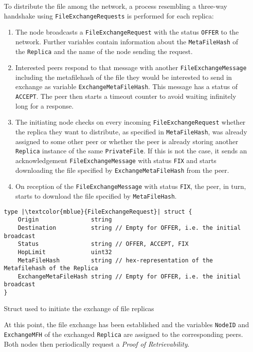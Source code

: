\documentclass{article}
\begin{document}
To distribute the file among the network, a process resembling a three-way handshake using \texttt{FileExchangeRequests} is performed for each replica:
\begin{enumerate}
	\item The node broadcasts a \texttt{FileExchangeRequest} with the status \texttt{OFFER} to the network. Further variables contain information about the \texttt{MetaFileHash} of the \texttt{Replica} and the name of the node sending the request.
	\item Interested peers respond to that message with another \texttt{FileExchangeMessage} including the metafilehash of the file they would be interested to send in exchange as variable \texttt{ExchangeMetaFileHash}. This message has a status of \texttt{ACCEPT}. The peer then starts a timeout counter to avoid waiting infinitely long for a response.
	\item The initiating node checks on every incoming \texttt{FileExchangeRequest} whether the replica they want to distribute, as specified in \texttt{MetaFileHash}, was already assigned to some other peer or whether the peer is already storing another \texttt{Replica} instance of the same \texttt{PrivateFile}. If this is not the case, it sends an acknowledgement \texttt{FileExchangeMessage} with status \texttt{FIX} and starts downloading the file specified by \texttt{ExchangeMetaFileHash} from the peer. 
	\item On reception of the \texttt{FileExchangeMessage} with status \texttt{FIX}, the peer, in turn, starts to download the file specified by \texttt{MetaFileHash}.
\end{enumerate}

\begin{listing}
\begin{verbatim}
type |\textcolor{mblue}{FileExchangeRequest}| struct {
	Origin               string 
	Destination          string // Empty for OFFER, i.e. the initial broadcast
	Status               string // OFFER, ACCEPT, FIX
	HopLimit             uint32
	MetaFileHash         string // hex-representation of the Metafilehash of the Replica
	ExchangeMetaFileHash string // Empty for OFFER, i.e. the initial broadcast
}
\end{verbatim}
\caption{Struct used to initiate the exchange of file replicas}
\end{listing}

\noindent 
At this point, the file exchange has been established and the variables \texttt{NodeID} and \texttt{ExchangeMFH} of the exchanged \texttt{Replica} are assigned to the corresponding peers. Both nodes then periodically request a \emph{Proof of Retrievability}.
\\\vspace{0.5em}
\end{document}
